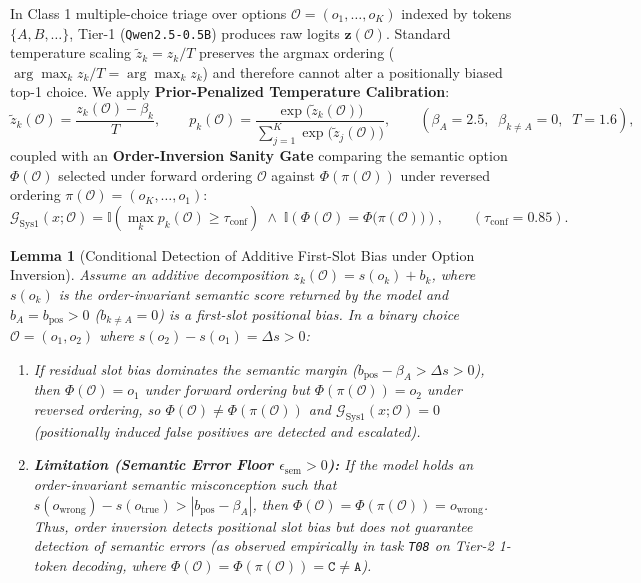 \documentclass[10pt,a4paper]{article}
\newtheorem{lemma}{Lemma}
\begin{document}
In Class 1 multiple-choice triage over options $\mathcal{O} = (o_1, \dots, o_K)$ indexed by tokens $\{A, B, \dots\}$, Tier-1 (\texttt{Qwen2.5-0.5B}) produces raw logits $\mathbf{z}(\mathcal{O})$. Standard temperature scaling $\tilde{z}_k = z_k / T$ preserves the argmax ordering ($\arg\max_k z_k/T = \arg\max_k z_k$) and therefore cannot alter a positionally biased top-1 choice. We apply \textbf{Prior-Penalized Temperature Calibration}:
\begin{equation}
\label{eq:system1_cal}
\tilde{z}_k(\mathcal{O}) = \frac{z_k(\mathcal{O}) - \beta_k}{T}, \qquad p_k(\mathcal{O}) = \frac{\exp\big(\tilde{z}_k(\mathcal{O})\big)}{\sum_{j=1}^K \exp\big(\tilde{z}_j(\mathcal{O})\big)}, \qquad (\beta_A = 2.5,\;\; \beta_{k \neq A} = 0,\;\; T = 1.6),
\end{equation}
coupled with an \textbf{Order-Inversion Sanity Gate} comparing the semantic option $\Phi(\mathcal{O})$ selected under forward ordering $\mathcal{O}$ against $\Phi(\pi(\mathcal{O}))$ under reversed ordering $\pi(\mathcal{O}) = (o_K, \dots, o_1)$:
\begin{equation}
\label{eq:gate_sys1}
\mathcal{G}_{\text{Sys1}}(x; \mathcal{O}) = \mathbb{I}\!\left(\max_{k} p_k(\mathcal{O}) \ge \tau_{\text{conf}}\right) \;\land\; \mathbb{I}\!\left(\Phi(\mathcal{O}) = \Phi\big(\pi(\mathcal{O})\big)\right), \qquad (\tau_{\text{conf}} = 0.85).
\end{equation}

\begin{lemma}[Conditional Detection of Additive First-Slot Bias under Option Inversion]
\label{lemma:inversion}
Assume an additive decomposition $z_k(\mathcal{O}) = s(o_k) + b_k$, where $s(o_k)$ is the order-invariant semantic score returned by the model and $b_A = b_{\text{pos}} > 0$ ($b_{k \neq A} = 0$) is a first-slot positional bias. In a binary choice $\mathcal{O} = (o_1, o_2)$ where $s(o_2) - s(o_1) = \Delta s > 0$:
\begin{enumerate}
    \item If residual slot bias dominates the semantic margin ($b_{\text{pos}} - \beta_A > \Delta s > 0$), then $\Phi(\mathcal{O}) = o_1$ under forward ordering but $\Phi(\pi(\mathcal{O})) = o_2$ under reversed ordering, so $\Phi(\mathcal{O}) \neq \Phi(\pi(\mathcal{O}))$ and $\mathcal{G}_{\text{Sys1}}(x; \mathcal{O}) = 0$ (positionally induced false positives are detected and escalated).
    \item \textbf{Limitation (Semantic Error Floor $\epsilon_{\text{sem}} > 0$):} If the model holds an order-invariant semantic misconception such that $s(o_{\text{wrong}}) - s(o_{\text{true}}) > |b_{\text{pos}} - \beta_A|$, then $\Phi(\mathcal{O}) = \Phi(\pi(\mathcal{O})) = o_{\text{wrong}}$. Thus, order inversion detects positional slot bias but does \emph{not} guarantee detection of semantic errors (as observed empirically in task \texttt{T08} on Tier-2 1-token decoding, where $\Phi(\mathcal{O}) = \Phi(\pi(\mathcal{O})) = \texttt{C} \neq \texttt{A}$).
\end{enumerate}
\end{lemma}
\end{document}
